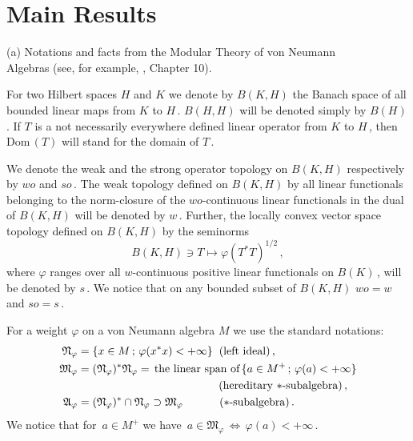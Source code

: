 \documentclass[reqno]{amsart}
\theoremstyle{definition}
\theoremstyle{remark}
\numberwithin{equation}{section}
\theoremstyle{plain}
\begin{document}
\bigskip
\section{Main Results}

\bigskip
\noindent (a) {\sc Notations and facts from the Modular Theory
of von Neumann}
\\ \phantom{xx} {\sc Algebras} (see, for example, \cite{S-Z}, Chapter 10).
\bigskip

For two Hilbert spaces $H$ and $K$ we denote by $B(K,H)$ the Banach
space of all bounded linear maps from $K$ to $H\,$. $B(H,H)$ will
be denoted simply by $B(H)\,$. If $T$ is a not necessarily
everywhere defined linear operator from $K$ to $H\,$, then Dom$\, (T)$
will stand for the domain of $T\,$.

We denote the weak and the strong operator topology on $B(K,H)$
respectively by $wo$ and $so\,$. The weak topology defined on $B(K,H)$
by all linear functionals belonging to the norm-closure of the
$wo$-continuous linear functionals in the dual of $B(K,H)$ will be
denoted by $w\,$. Further, the locally convex vector space topology
defined on $B(K,H)$ by the seminorms
\begin{equation*}
B(K,H)\ni T\longmapsto\varphi (T^*T)^{1/2}\, ,
\end{equation*}
where $\varphi$ ranges over all $w$-continuous positive linear
functionals on $B(K)\,$, will be denoted by $s\,$. We notice that
on any bounded subset of $B(K,H)$ $wo=w$ and $so=s\,$.

For a weight $\varphi$ on a von Neumann algebra $M$ we use the
standard notations:
\begin{align*}
\mathfrak N_\varphi &=\{ x\in M\, ;\,\varphi (x^*x)<+\infty\}
\hspace{0.2 cm} (\text{left ideal})\, , \\
\mathfrak M_\varphi &=(\mathfrak N_\varphi )^*\mathfrak N_\varphi =
\,\text{the linear span of}\,\{ a\in M^+\, ;\,\varphi (a)<+\infty\} \\
&\hspace{4.45 cm} (\text{hereditary $*$-subalgebra})\, ,\notag \\
\mathfrak A_\varphi &= (\mathfrak N_\varphi )^*\cap
\mathfrak N_\varphi \supset \mathfrak M_\varphi
\hspace{1.15 cm} (*\text{-subalgebra})\, .
\end{align*}
We notice that for $\, a\in M^+$ we have $\, a\in\mathfrak M_\varphi
\,\Longleftrightarrow\, \varphi (a)<+\infty\,$.
\end{document}
